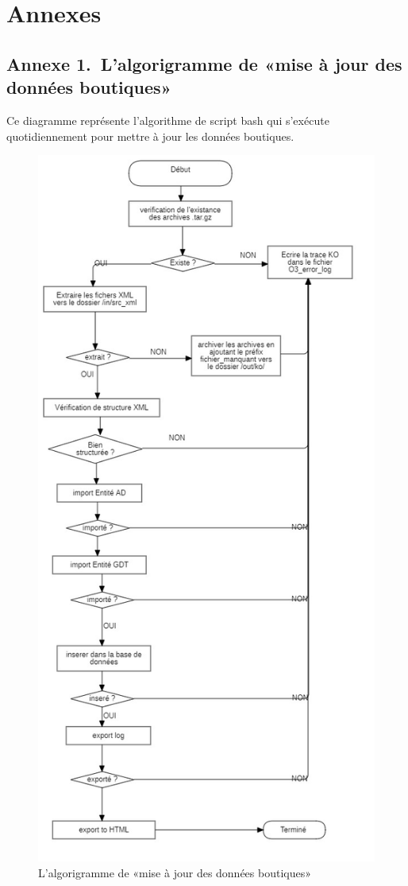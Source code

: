 \chapter*{Annexes}


\section*{Annexe 1.~L'algorigramme de «mise à jour des données boutiques»}
Ce diagramme représente l'algorithme de script bash qui s'exécute quotidiennement pour mettre à jour les données boutiques.
\begin{figure}[H]
	\centering
	\includegraphics[width=0.5\linewidth]{img/conception/FlowchartDiagram-update-boutique}
	\caption[L'algorigramme de «mise à jour des données boutiques»]{L'algorigramme de «mise à jour des données boutiques»}
	\label{fig:flowchartdiagram-update-boutique}
\end{figure}
\newpage
